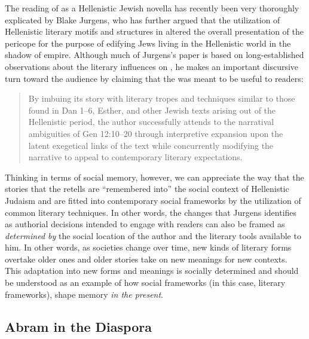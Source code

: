 The reading of \ga {} as a Hellenistic Jewish novella has recently been very thoroughly explicated by Blake Jurgens, who has further argued that the utilization of Hellenistic literary motifs and structures in \ga altered the overall presentation of the pericope for the purpose of edifying Jews living in the Hellenistic world in the shadow of empire.\autocite{jurgens_jsj2018} Although much of Jurgens's paper is based on long-established observations about the literary influences on \ga, he makes an important discursive turn toward the audience by claiming that the \ga was meant to be useful to readers:

\begin{quote}
By imbuing its story with literary tropes and techniques similar to those found in Dan 1--6, Esther, and other Jewish texts arising out of the Hellenistic period, the author successfully attends to the narratival ambiguities of Gen 12:10--20 through interpretive expansion upon the latent exegetical links of the text while concurrently modifying the narrative to appeal to contemporary literary expectations.\autocite[27]{jurgens_jsj2018} \end{quote}

Thinking in terms of social memory, however, we can appreciate the way that the stories that the \ga retells are ``remembered into'' the social context of Hellenistic Judaism and are fitted into contemporary social frameworks by the utilization of common literary techniques. In other words, the changes that Jurgens identifies as authorial decisions intended to engage with readers can also be framed as \emph{determined by} the social location of the author and the literary tools available to him. In other words, as societies change over time, new kinds of literary forms overtake older ones and older stories take on new meanings for new contexts. This adaptation into new forms and meanings is socially determined and should be understood as an example of how social frameworks (in this case, literary frameworks), shape memory \emph{in the present}.

\subsection{Abram in the Diaspora}

